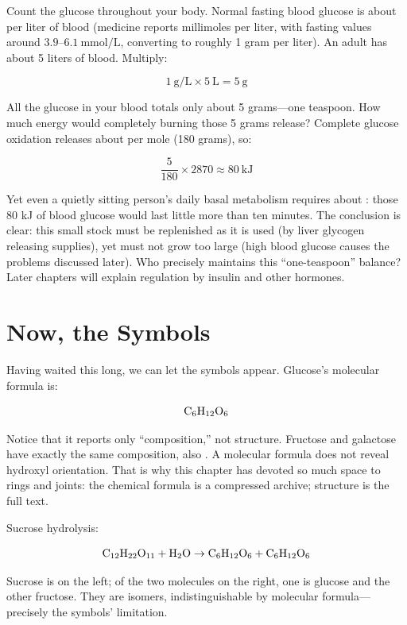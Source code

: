\begin{qiaoliang}
Count the glucose throughout your body. Normal fasting blood glucose is about  per liter of blood (medicine reports millimoles per liter, with fasting values around $3.9$--$6.1\ \mathrm{mmol/L}$, converting to roughly 1 gram per liter). An adult has about 5 liters of blood. Multiply:

\[1\ \mathrm{g/L}\times 5\ \mathrm{L}=5\ \mathrm{g}\]

All the glucose in your blood totals only about 5 grams---one teaspoon. How much energy would completely burning those 5 grams release? Complete glucose oxidation releases about  per mole (180 grams), so:

\[\frac{5}{180}\times 2870\approx 80\ \mathrm{kJ}\]

Yet even a quietly sitting person's daily basal metabolism requires about : those 80 kJ of blood glucose would last little more than ten minutes. The conclusion is clear: this small stock must be replenished as it is used (by liver glycogen releasing supplies), yet must not grow too large (high blood glucose causes the problems discussed later). Who precisely maintains this ``one-teaspoon'' balance? Later chapters will explain regulation by insulin and other hormones.
\end{qiaoliang}

\section{Now, the Symbols}

Having waited this long, we can let the symbols appear. Glucose's molecular formula is:

\[\mathrm{C_6H_{12}O_6}\]

Notice that it reports only ``composition,'' not structure. Fructose and galactose have exactly the same composition, also . A molecular formula does not reveal hydroxyl orientation. That is why this chapter has devoted so much space to rings and joints: the chemical formula is a compressed archive; structure is the full text.

Sucrose hydrolysis:

\[\mathrm{C_{12}H_{22}O_{11}} + \mathrm{H_2O} \rightarrow \mathrm{C_6H_{12}O_6} + \mathrm{C_6H_{12}O_6}\]

Sucrose is on the left; of the two  molecules on the right, one is glucose and the other fructose. They are isomers, indistinguishable by molecular formula---precisely the symbols' limitation.

